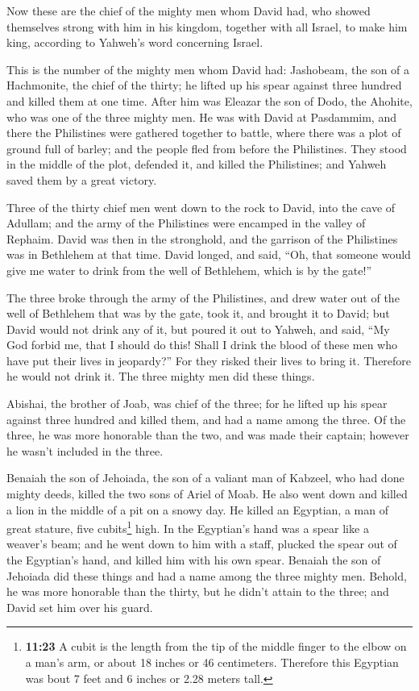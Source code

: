  Now these are the chief of the mighty men whom David
had, who showed themselves strong with him in his kingdom, together with
all Israel, to make him king, according to Yahweh's word concerning
Israel.

 This is the number of the mighty men whom David had:
Jashobeam, the son of a Hachmonite, the chief of the thirty; he lifted
up his spear against three hundred and killed them at one time.
 After him was Eleazar the son of Dodo, the Ahohite, who
was one of the three mighty men.  He was with David at
Pasdammim, and there the Philistines were gathered together to battle,
where there was a plot of ground full of barley; and the people fled
from before the Philistines.  They stood in the middle of
the plot, defended it, and killed the Philistines; and Yahweh saved them
by a great victory.

 Three of the thirty chief men went down to the rock to
David, into the cave of Adullam; and the army of the Philistines were
encamped in the valley of Rephaim.  David was then in the
stronghold, and the garrison of the Philistines was in Bethlehem at that
time.  David longed, and said, ``Oh, that someone would
give me water to drink from the well of Bethlehem, which is by the
gate!''

 The three broke through the army of the Philistines, and
drew water out of the well of Bethlehem that was by the gate, took it,
and brought it to David; but David would not drink any of it, but poured
it out to Yahweh,  and said, ``My God forbid me, that I
should do this! Shall I drink the blood of these men who have put their
lives in jeopardy?'' For they risked their lives to bring it. Therefore
he would not drink it. The three mighty men did these things.

 Abishai, the brother of Joab, was chief of the three;
for he lifted up his spear against three hundred and killed them, and
had a name among the three.  Of the three, he was more
honorable than the two, and was made their captain; however he wasn't
included in the three.

 Benaiah the son of Jehoiada, the son of a valiant man of
Kabzeel, who had done mighty deeds, killed the two sons of Ariel of
Moab. He also went down and killed a lion in the middle of a pit on a
snowy day.  He killed an Egyptian, a man of great
stature, five cubits\footnote{\textbf{11:23} A cubit is the length from
  the tip of the middle finger to the elbow on a man's arm, or about 18
  inches or 46 centimeters. Therefore this Egyptian was bout 7 feet and
  6 inches or 2.28 meters tall.} high. In the Egyptian's hand was a
spear like a weaver's beam; and he went down to him with a staff,
plucked the spear out of the Egyptian's hand, and killed him with his
own spear.  Benaiah the son of Jehoiada did these things
and had a name among the three mighty men.  Behold, he
was more honorable than the thirty, but he didn't attain to the three;
and David set him over his guard.

